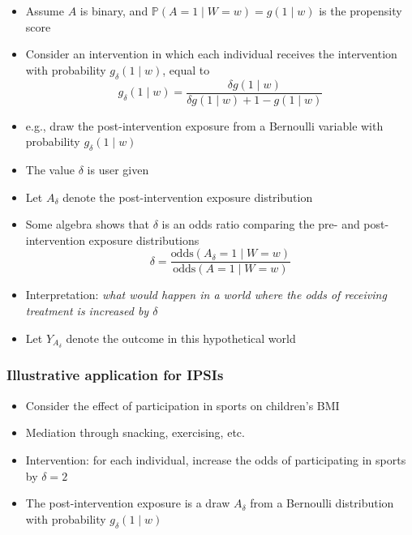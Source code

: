 \documentclass[
  12pt,
]{book}
\providecommand{\tightlist}{%
  \setlength{\itemsep}{0pt}\setlength{\parskip}{0pt}}
\theoremstyle{definition}
\theoremstyle{definition}
\theoremstyle{definition}
\renewcommand{\P}{\mathbb{P}}
\newcommand{\1}{\mathbbm{1}}
\begin{document}
\begin{itemize}
\tightlist
\item
  Assume \(A\) is binary, and \(\P(A=1\mid W=w) = g(1\mid w)\) is the propensity score
\item
  Consider an intervention in which each individual receives the intervention
  with probability \(g_\delta(1\mid w)\), equal to
  \begin{equation*}
    g_\delta(1\mid w)=\frac{\delta g(1\mid w)}{\delta g(1\mid w) +
    1 - g(1\mid w)}
  \end{equation*}
\item
  e.g., draw the post-intervention exposure from a Bernoulli variable with
  probability \(g_\delta(1\mid w)\)
\item
  The value \(\delta\) is user given
\item
  Let \(A_\delta\) denote the post-intervention exposure distribution
\item
  Some algebra shows that \(\delta\) is an odds ratio comparing the pre- and
  post-intervention exposure distributions
  \begin{equation*}
    \delta = \frac{\text{odds}(A_\delta = 1\mid W=w)}
    {\text{odds}(A = 1\mid W=w)}
  \end{equation*}
\item
  Interpretation: \emph{what would happen in a
  world where the odds of receiving treatment is increased by \(\delta\)}
\item
  Let \(Y_{A_\delta}\) denote the outcome in this hypothetical world
\end{itemize}

\hypertarget{illustrative-application-for-ipsis}{%
\subsubsection{Illustrative application for IPSIs}\label{illustrative-application-for-ipsis}}

\begin{itemize}
\tightlist
\item
  Consider the effect of participation in sports on children's BMI
\item
  Mediation through snacking, exercising, etc.
\item
  Intervention: for each individual, increase the odds of participating in
  sports by \(\delta=2\)
\item
  The post-intervention exposure is a draw \(A_\delta\) from a Bernoulli
  distribution with probability \(g_\delta(1\mid w)\)
\end{itemize}
\end{document}
